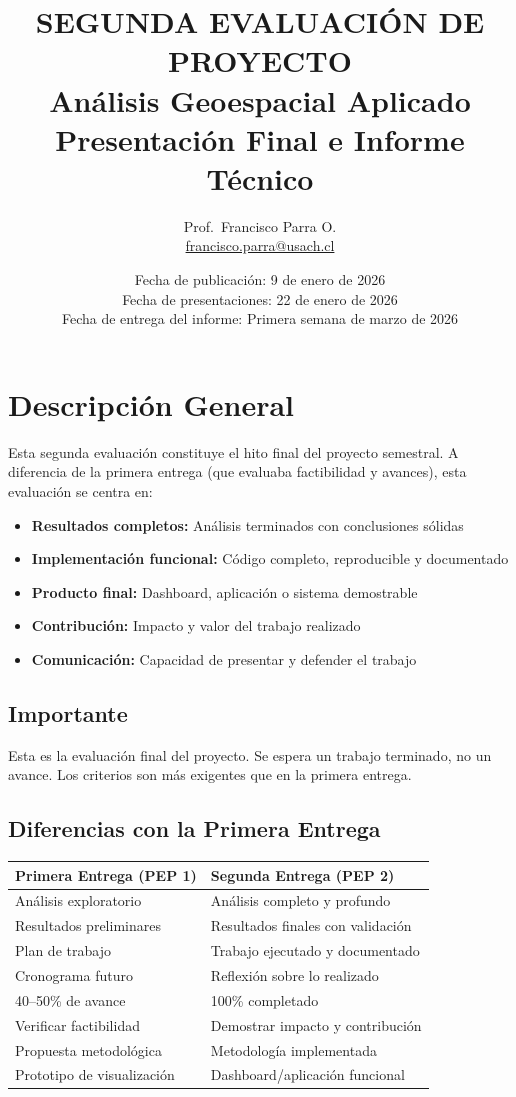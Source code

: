 \documentclass[11pt,a4paper]{article}
\title{SEGUNDA EVALUACIÓN DE PROYECTO\\Análisis Geoespacial Aplicado\\Presentación Final e Informe Técnico}
\author{Prof.\ Francisco Parra O.\\\href{mailto:francisco.parra@usach.cl}{francisco.parra@usach.cl}}
\date{Fecha de publicación: 9 de enero de 2026\\Fecha de presentaciones: 22 de enero de 2026\\Fecha de entrega del informe: Primera semana de marzo de 2026}
\begin{document}
\maketitle
\tableofcontents
\newpage

\section{Descripción General}
Esta segunda evaluación constituye el hito final del proyecto semestral. A diferencia de la primera
entrega (que evaluaba factibilidad y avances), esta evaluación se centra en:
\begin{itemize}[leftmargin=*]
\item \textbf{Resultados completos:} Análisis terminados con conclusiones sólidas
\item \textbf{Implementación funcional:} Código completo, reproducible y documentado
\item \textbf{Producto final:} Dashboard, aplicación o sistema demostrable
\item \textbf{Contribución:} Impacto y valor del trabajo realizado
\item \textbf{Comunicación:} Capacidad de presentar y defender el trabajo
\end{itemize}

\subsection*{Importante}
Esta es la evaluación final del proyecto. Se espera un trabajo terminado, no un avance. Los
criterios son más exigentes que en la primera entrega.

\subsection{Diferencias con la Primera Entrega}
\begin{center}
\begin{tabular}{p{} p{}}
\toprule
\textbf{Primera Entrega (PEP 1)} & \textbf{Segunda Entrega (PEP 2)}\\
\midrule
Análisis exploratorio & Análisis completo y profundo\\
Resultados preliminares & Resultados finales con validación\\
Plan de trabajo & Trabajo ejecutado y documentado\\
Cronograma futuro & Reflexión sobre lo realizado\\
40--50\% de avance & 100\% completado\\
Verificar factibilidad & Demostrar impacto y contribución\\
Propuesta metodológica & Metodología implementada\\
Prototipo de visualización & Dashboard/aplicación funcional\\
\bottomrule
\end{tabular}
\end{center}
\end{document}
